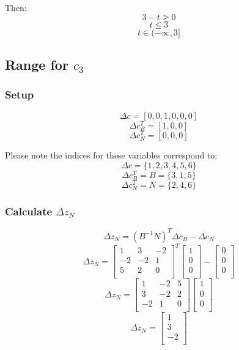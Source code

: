 \documentclass[14pt]{extarticle}
\begin{document}
\bigskip Then:
\[
    3 - t \geq 0
\]
\[
    t \leq 3
\]
\[
    t \in (-\infty, 3]
\]

\subsection*{Range for $c_3$}
\subsubsection*{Setup}
\[
    \Delta c = [0, 0, 1, 0, 0, 0]
\]
\[
    \Delta c^T_B = [1, 0, 0]
\]
\[
    \Delta c^T_N = [0, 0, 0]
\]

\bigskip Please note the indices for these variables correspond to:
\[
    \Delta c = \{1, 2, 3, 4, 5, 6\}
\]
\[
    \Delta c^T_B = B = \{3, 1, 5\}
\]
\[
    \Delta c^T_N = N = \{2, 4, 6\}
\]

\subsubsection*{Calculate $\Delta z_N$}
\[
    \Delta z_N = (B^{-1}N)^T \Delta c_B - \Delta c_N
\]
\[
    \Delta z_N = \begin{bmatrix}
        1 & 3 & -2 \\
        -2 & -2 & 1 \\
        5 & 2 & 0 \\
    \end{bmatrix}^T
    \begin{bmatrix}
        1 \\
        0 \\
        0 \\
    \end{bmatrix}
    - \begin{bmatrix}
        0 \\
        0 \\
        0 \\
    \end{bmatrix}
\]
\[
    \Delta z_N = \begin{bmatrix}
        1 & -2 & 5 \\
        3 & -2 & 2 \\
        -2 & 1 & 0 \\
    \end{bmatrix}
    \begin{bmatrix}
        1 \\
        0 \\
        0 \\
    \end{bmatrix}
\]
\[
    \Delta z_N = \begin{bmatrix}
        1 \\
        3 \\
        -2 \\
    \end{bmatrix}
\]
\end{document}
